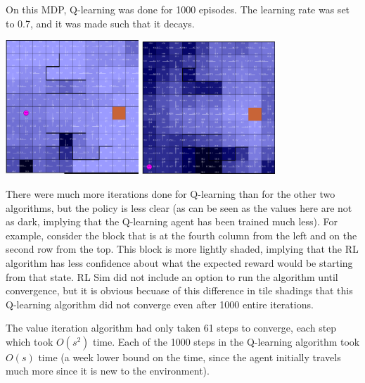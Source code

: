 \documentclass[11pt]{article}
\begin{document}
            On this MDP, Q-learning was done for 1000 episodes. The learning
            rate was set to 0.7, and it was made such that it decays.

            \includegraphics[width=5cm]{../images/small/q_middle.PNG}
            \includegraphics[width=5cm]{../images/small/q_1000.PNG}

            There were much more iterations done for Q-learning than
            for the other two algorithms, but the policy is less clear
            (as can be seen as the values here are not as dark, implying
            that the Q-learning agent has been trained much less). For example,
            consider the block that is at the fourth column from the left
            and on the second row from the top. This block is more lightly shaded,
            implying that the RL algorithm has less confidence about what the
            expected reward would be starting from that state. RL Sim did
            not include an option to run the algorithm until convergence,
            but it is obvious becuase of this difference in tile shadings
            that this Q-learning algorithm did not converge even after 1000
            entire iterations.

            The value iteration algorithm had only taken 61 steps to converge,
            each step which took $O(s^2)$ time. Each of the 1000 steps in the
            Q-learning algorithm took $O(s)$ time (a week lower bound on the
            time, since the agent initially travels much more since it is
            new to the environment).
\end{document}
